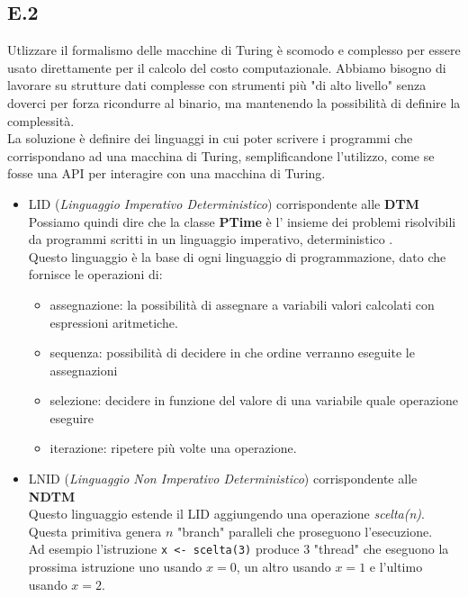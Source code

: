 \documentclass[a4paper]{article}
\begin{document}
\subsection{E.2}
Utlizzare il formalismo delle macchine di Turing è scomodo e complesso per essere usato direttamente per il calcolo del costo computazionale.
Abbiamo bisogno di lavorare su strutture dati complesse con strumenti più "di alto livello" senza doverci per forza ricondurre al binario, ma mantenendo la possibilità di definire la complessità.\\
La soluzione è definire dei linguaggi in cui poter scrivere i programmi che corrispondano ad una macchina di Turing, semplificandone l'utilizzo, come se fosse una API per interagire con una macchina di Turing.
\begin{itemize}
	\item LID (\textit{Linguaggio Imperativo Deterministico}) corrispondente alle \textbf{DTM}\\
		Possiamo quindi dire che la classe \textbf{PTime} è l' insieme dei problemi risolvibili da programmi scritti in un linguaggio imperativo, deterministico .\\
		Questo linguaggio è la base di ogni linguaggio di programmazione, dato che fornisce le operazioni di:
		\begin{itemize}
			\item assegnazione: la possibilità di assegnare a variabili valori calcolati con espressioni aritmetiche.
			\item sequenza: possibilità di decidere in che ordine verranno eseguite le assegnazioni
			\item selezione: decidere in funzione del valore di una variabile quale operazione eseguire
			\item iterazione: ripetere più volte una operazione.
		\end{itemize}
	\item LNID (\textit{Linguaggio Non Imperativo Deterministico}) corrispondente alle \textbf{NDTM}\\
		Questo linguaggio estende il LID aggiungendo una operazione \textit{scelta(n)}.
		Questa primitiva genera $n$ "branch" paralleli che proseguono l'esecuzione.\\
		Ad esempio l'istruzione \texttt{x <- scelta(3)} produce 3 "thread" che eseguono la prossima istruzione uno usando $x=0$, un altro usando $x=1$ e l'ultimo usando $x=2$.\\
		\begin{figure}[!ht]

\end{figure}
\end{itemize}
\end{document}
